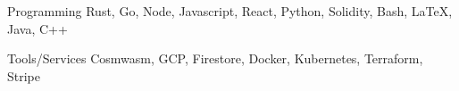 



\begin{cvskills}

  \cvskill
    {Programming} %
    {Rust, Go, Node, Javascript, React, Python, Solidity, Bash, \LaTeX, Java, C++} %

  \cvskill
    {Tools/Services} %
    {Cosmwasm, GCP, Firestore, Docker, Kubernetes, Terraform, Stripe} %

\end{cvskills}


% 
% 
% 
% 
% 
% 
